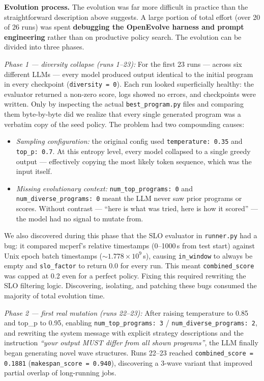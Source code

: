 \begin{enumerate}
\begin{enumerate}
\medskip
\noindent\textbf{Evolution process.}
The evolution was far more difficult in practice than the straightforward description above suggests. A large portion of total effort (over 20 of 26 runs) was spent \textbf{debugging the OpenEvolve harness and prompt engineering} rather than on productive policy search. The evolution can be divided into three phases.

\textit{Phase 1 --- diversity collapse (runs 1--23):} For the first 23 runs --- across six different LLMs --- every model produced output identical to the initial program in every checkpoint (\texttt{diversity = 0}). Each run looked superficially healthy: the evaluator returned a non-zero score, logs showed no errors, and checkpoints were written. Only by inspecting the actual \texttt{best\_program.py} files and comparing them byte-by-byte did we realize that every single generated program was a verbatim copy of the seed policy. The problem had two compounding causes:
\begin{itemize}
  \item \emph{Sampling configuration:} the original config used \texttt{temperature: 0.35} and \texttt{top\_p: 0.7}. At this entropy level, every model collapsed to a single greedy output --- effectively copying the most likely token sequence, which was the input itself.
  \item \emph{Missing evolutionary context:} \texttt{num\_top\_programs: 0} and \texttt{num\_diverse\_programs: 0} meant the LLM never saw prior programs or scores. Without contrast --- ``here is what was tried, here is how it scored'' --- the model had no signal to mutate from.
\end{itemize}
We also discovered during this phase that the SLO evaluator in \texttt{runner.py} had a bug: it compared mcperf's relative timestamps (0--1000\,s from test start) against Unix epoch batch timestamps ($\sim 1.778 \times 10^9$\,s), causing \texttt{in\_window} to always be empty and \texttt{slo\_factor} to return 0.0 for every run. This meant \texttt{combined\_score} was capped at 0.2 even for a perfect policy. Fixing this required rewriting the SLO filtering logic. Discovering, isolating, and patching these bugs consumed the majority of total evolution time.

\textit{Phase 2 --- first real mutation (runs 22--23):} After raising temperature to 0.85 and top\_p to 0.95, enabling \texttt{num\_top\_programs: 3} / \texttt{num\_diverse\_programs: 2}, and rewriting the system message with explicit strategy descriptions and the instruction \emph{``your output MUST differ from all shown programs''}, the LLM finally began generating novel wave structures. Runs 22--23 reached \texttt{combined\_score = 0.1881} (\texttt{makespan\_score = 0.940}), discovering a 3-wave variant that improved partial overlap of long-running jobs.


\end{enumerate}
\end{enumerate}

